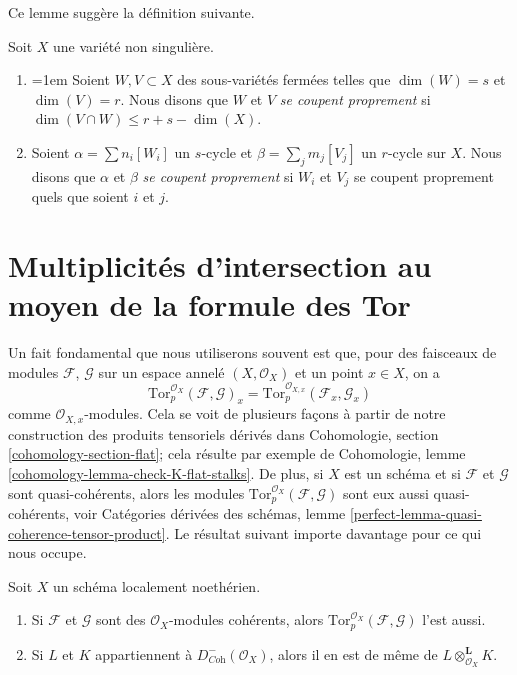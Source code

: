 \noindent
Ce lemme suggère la définition suivante.

\begin{definition}
\label{definition-proper-intersection}
Soit $X$ une variété non singulière.
\begin{enumerate}
\item {\emergencystretch=1em Soient $W,V \subset X$ des sous-variétés fermées telles que
$\dim(W) = s$ et $\dim(V) = r$. Nous disons que $W$ et $V$
{\it se coupent proprement} si $\dim(V \cap W) \leq r + s - \dim(X)$.\par}
\item Soient $\alpha = \sum n_i [W_i]$ un $s$-cycle
et $\beta = \sum_j m_j [V_j]$ un $r$-cycle sur $X$. Nous disons
que $\alpha$ et $\beta$ {\it se coupent proprement} si
$W_i$ et $V_j$ se coupent proprement quels que soient $i$ et $j$.
\end{enumerate}
\end{definition}


\section{Multiplicités d'intersection au moyen de la formule des Tor}
\label{section-tor-formula}

\noindent
Un fait fondamental que nous utiliserons souvent est que, pour des faisceaux de
modules $\mathcal{F}$, $\mathcal{G}$ sur un espace annelé $(X, \mathcal{O}_X)$
et un point $x \in X$, on a
$$
\text{Tor}_p^{\mathcal{O}_X}(\mathcal{F}, \mathcal{G})_x =
\text{Tor}_p^{\mathcal{O}_{X, x}}(\mathcal{F}_x, \mathcal{G}_x)
$$
comme $\mathcal{O}_{X, x}$-modules. Cela se voit de plusieurs façons
à partir de notre construction des produits tensoriels dérivés dans
Cohomologie, section \ref{cohomology-section-flat}; cela résulte par exemple de
Cohomologie, lemme \ref{cohomology-lemma-check-K-flat-stalks}.
De plus, si $X$ est un schéma et si $\mathcal{F}$ et $\mathcal{G}$
sont quasi-cohérents, alors les modules
$\text{Tor}_p^{\mathcal{O}_X}(\mathcal{F}, \mathcal{G})$ sont eux aussi
quasi-cohérents, voir
Catégories dérivées des schémas, lemme
\ref{perfect-lemma-quasi-coherence-tensor-product}.
Le résultat suivant importe davantage pour ce qui nous occupe.

\begin{lemma}
\label{lemma-tensor-coherent}
Soit $X$ un schéma localement noethérien.
\begin{enumerate}
\item Si $\mathcal{F}$ et $\mathcal{G}$ sont des $\mathcal{O}_X$-modules cohérents,
alors $\text{Tor}_p^{\mathcal{O}_X}(\mathcal{F}, \mathcal{G})$ l'est aussi.
\item Si $L$ et $K$ appartiennent à $D^-_{\textit{Coh}}(\mathcal{O}_X)$, alors
il en est de même de $L \otimes_{\mathcal{O}_X}^\mathbf{L} K$.
\end{enumerate}
\end{lemma}

